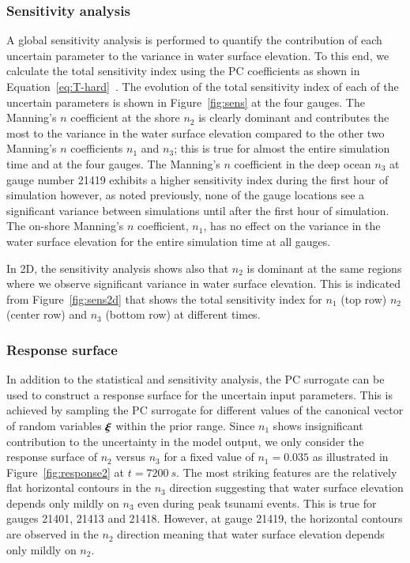         
\subsubsection{Sensitivity analysis}
A global sensitivity analysis is performed to quantify the contribution of each
uncertain parameter to the variance in water surface elevation. To this end, we calculate 
the total sensitivity index using the PC coefficients as shown in Equation~\eqref{eq:T-hard}~\citep{Alexanderian2012,Sudret,Crestaux}. The evolution of the total sensitivity index
of each of the uncertain parameters is shown in Figure~\ref{fig:sens} at the four gauges. 
The Manning's $n$ coefficient at the shore $n_2$ is clearly dominant and contributes
the most to the variance in the water surface elevation compared to the other two 
Manning's $n$ coefficients $n_1$ and $n_3$; this is true for almost the entire simulation time
and at the four gauges. The Manning's $n$ coefficient in the deep ocean $n_{3}$ at gauge number 21419 exhibits a higher sensitivity index during the first hour of simulation however, as noted previously, none of the gauge locations see a significant variance between simulations until after the first hour of simulation.
The on-shore Manning's $n$ coefficient, $n_{1 }$, has no effect on the variance in
the water surface elevation for the entire simulation time at all gauges.

In 2D, the sensitivity analysis shows also that $n_2$ is dominant
at the same regions where we observe significant variance in water surface elevation. This is
indicated from Figure~\ref{fig:sens2d} that shows the total sensitivity index
for $n_1$ (top row) $n_2$ (center row) and $n_3$ (bottom row)
at different times.

\subsubsection{Response surface}
In addition to the statistical and sensitivity analysis, the PC surrogate 
can be used to construct a response surface for the uncertain input parameters.
This is achieved by sampling the PC surrogate for different values of the 
canonical vector of random variables  $\xxi$ within the prior
range. Since $n_1$ shows insignificant contribution to the 
uncertainty in the model output, we only consider the response surface
of $n_2$ versus $n_3$ for a fixed value of $n_1=0.035$ as illustrated in Figure~\ref{fig:response2}
at $t=7200~s$. The most striking features are the relatively flat
horizontal contours in the $n_3$ direction suggesting that water surface elevation depends
only mildly on $n_3$ even during peak tsunami events. This is true for gauges 21401, 21413 and 21418. However,
at gauge 21419, the horizontal contours are observed in the $n_2 $ direction
meaning that water surface elevation depends only mildly on $n_2$.